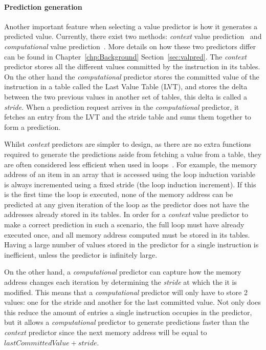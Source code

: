 \paragraph*{Prediction generation} Another important feature when selecting a value predictor is how it generates a predicted value.
Currently, there exist two methods: \textit{context} value prediction~\cite{peraisVTAGE2014} and \textit{computational} value prediction~\cite{peraisBeBop2015,gabbayVPOrig,goeman01dfcm}.
More details on how these two predictors differ can be found in Chapter~\ref{chp:Background} Section~\ref{sec:valpred}.
The \textit{context} predictor stores all the different values committed by the instruction in its tables.
On the other hand the \textit{computational} predictor stores the committed value of the instruction in a table called the Last Value Table (LVT), and stores the delta between the two previous values in another set of tables, this delta is called a \textit{stride}.
When a prediction request arrives in the \textit{computational} predictor, it fetches an entry from the LVT and the stride table and sums them together to form a prediction.

Whilst \textit{context} predictors are simpler to design, as there are no extra functions required to generate the predictions aside from fetching a value from a table, they are often considered less efficient when used in loops~\cite{peraisBeBop2015}.
For example, the memory address of an item in an array that is accessed using the loop induction variable is always incremented using a fixed stride (the loop induction increment).
If this is the first time the loop is executed, none of the memory address can be predicted at any given iteration of the loop as the predictor does not have the addresses already stored in its tables.
In order for a \textit{context} value predictor to make a correct prediction in such a scenario, the full loop must have already executed once, and all memory address computed must be stored in its tables.
Having a large number of values stored in the predictor for a single instruction is inefficient, unless the predictor is infinitely large.

On the other hand, a \textit{computational} predictor can capture how the memory address changes each iteration by determining the \textit{stride} at which the it is modified.
This means that a \textit{computational} predictor will only have to store 2 values: one for the stride and another for the last committed value.
Not only does this reduce the amount of entries a single instruction occupies in the predictor, but it allows a \textit{computational} predictor to generate predictions faster than the \textit{context} predictor since the next memory address will be equal to $ lastCommittedValue + stride$.

